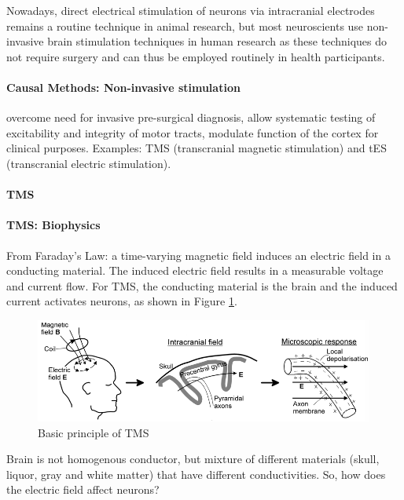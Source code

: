 \documentclass[12pt,article,oneside,a4paper]{memoir}
\begin{document}
Nowadays, direct electrical stimulation of neurons via intracranial electrodes remains a routine technique in animal research, but most neuroscients use non-invasive brain stimulation techniques in human research as these techniques do not require surgery and can thus be employed routinely in health participants.

\paragraph{Causal Methods: Non-invasive stimulation} overcome need for invasive pre-surgical diagnosis, allow systematic testing of excitability and integrity of motor tracts, modulate function of the cortex for clinical purposes. Examples: TMS (transcranial magnetic stimulation) and tES (transcranial electric stimulation).

\paragraph{TMS}

\paragraph{TMS: Biophysics} From Faraday's Law: a time-varying magnetic field induces an electric field in a conducting material. The induced electric field results in a measurable voltage and current flow. For TMS, the conducting material is the brain and the induced current activates neurons, as shown in Figure \ref{fig:tms}.

\begin{figure}
  \centering
  \includegraphics[width=\textwidth]{imgs/tms.png}
  \caption{Basic principle of TMS}
  \label{fig:tms}
\end{figure}

Brain is not homogenous conductor, but mixture of different materials (skull, liquor,
gray and white matter) that have different conductivities. So, how does the electric field affect neurons?
\end{document}
